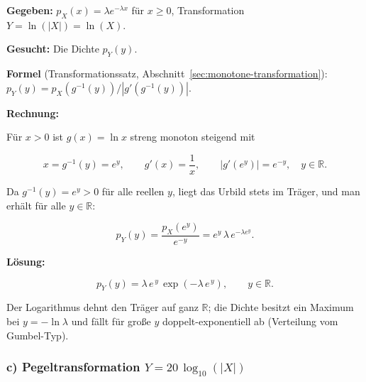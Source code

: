 \begin{beispiel}[Funktion einer Zufallsvariablen -- $Y = \ln(|X|)$]

\textbf{Gegeben:} $p_X(x) = \lambda e^{-\lambda x}$ für $x \geq 0$,
Transformation $Y = \ln(|X|) = \ln(X)$.

\textbf{Gesucht:} Die Dichte $p_Y(y)$.

\textbf{Formel} (Transformationssatz, Abschnitt~\ref{sec:monotone-transformation}):
$p_Y(y) = p_X(g^{-1}(y)) / |g'(g^{-1}(y))|$.

\textbf{Rechnung:}

Für $x > 0$ ist $g(x) = \ln x$ streng monoton steigend mit

$$
x = g^{-1}(y) = e^{y}, \qquad g'(x) = \frac{1}{x},
\qquad \left|g'(e^y)\right| = e^{-y}, \quad y \in \mathbb{R}.
$$

Da $g^{-1}(y) = e^y > 0$ für alle reellen $y$, liegt das Urbild stets im
Träger, und man erhält für alle $y \in \mathbb{R}$:

$$
p_Y(y) = \frac{p_X(e^y)}{e^{-y}} = e^{y}\,\lambda\, e^{-\lambda e^{y}}.
$$

\textbf{Lösung:}

$$
\boxed{\;p_Y(y) = \lambda\, e^{\,y}\, \exp\!\left(-\lambda\, e^{\,y}\right),
\qquad y \in \mathbb{R}.\;}
$$

Der Logarithmus dehnt den Träger auf ganz $\mathbb{R}$; die Dichte besitzt ein
Maximum bei $y = -\ln\lambda$ und fällt für große $y$ doppelt-exponentiell ab
(Verteilung vom Gumbel-Typ).

\end{beispiel}

\subsubsection*{c) Pegeltransformation $Y = 20\,\log_{10}(|X|)$}

